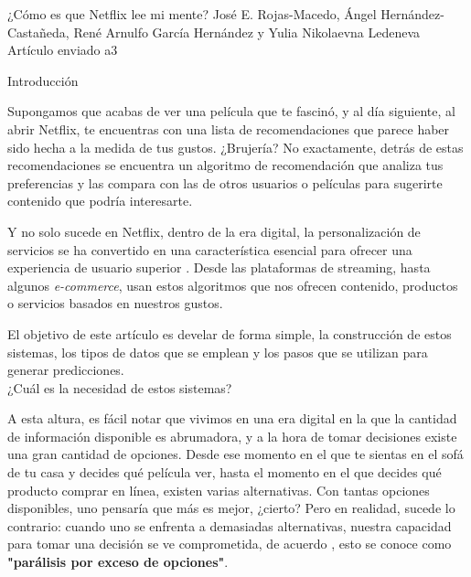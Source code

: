 \documentclass[letterpaper,10pt,final,hyphenatedtitles]{papertexKS}
\author{}
\title{}
\begin{document}
\newpage




\begin{news}{2}
	{¿Cómo es que Netflix lee mi mente?}
	{\textcolor{color}{José E. Rojas-Macedo}, \textcolor{color}{Ángel Hernández-Castañeda},  \textcolor{color}{René Arnulfo García Hernández} y \textcolor{color}{Yulia Nikolaevna Ledeneva}}
	{Artículo enviado}
	{a3}

	\noindent\textcolor{color}{\Large{Introducción}}

	Supongamos que acabas de ver una película que te fascinó, y al día siguiente, al abrir Netflix, te encuentras con una lista de recomendaciones que parece haber sido hecha a la medida de tus gustos. ¿Brujería? No exactamente, detrás de estas recomendaciones se encuentra un algoritmo de recomendación que analiza tus preferencias y las compara con las de otros usuarios o películas para sugerirte contenido que podría interesarte.
	
	Y no solo sucede en Netflix, dentro de la era digital, la personalización de servicios se ha convertido en una característica esencial para ofrecer una experiencia de usuario superior \cite{Deloitte2024}. Desde las plataformas de streaming, hasta algunos \textit{e-commerce}, usan estos algoritmos que nos ofrecen contenido, productos o servicios basados en nuestros gustos.

	El objetivo de este artículo es develar de forma simple, la construcción de estos sistemas, los tipos de datos que se emplean y los pasos que se utilizan para generar predicciones.
	\\

	\noindent\textcolor{color}{\Large{¿Cuál es la necesidad de estos sistemas?}}

	A esta altura, es fácil notar que vivimos en una era digital en la que la cantidad de información disponible es abrumadora, y a la hora de tomar decisiones existe una gran cantidad de opciones. Desde ese momento en el que te sientas en el sofá de tu casa y decides qué película ver, hasta el momento en el que decides qué producto comprar en línea, existen varias alternativas. Con tantas opciones disponibles, uno pensaría que más es mejor, ¿cierto? Pero en realidad, sucede lo contrario: cuando uno se enfrenta a demasiadas alternativas, nuestra capacidad para tomar una decisión se ve comprometida, de acuerdo \cite{schwartz2005qué}, esto se conoce como \textbf{"parálisis por exceso de opciones"}.


\end{news}
\end{document}
